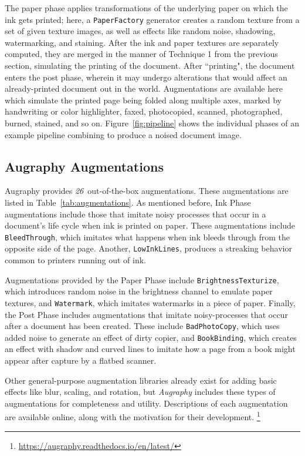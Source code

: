 \documentclass[runningheads]{llncs}
\newcommand{\numAugraphyAugmentations}{\emph{26}}
\begin{document}
The paper phase applies transformations of the underlying paper on which the ink gets printed; here, a \texttt{PaperFactory} generator creates a random texture from a set of given texture images, as well as effects like random noise, shadowing, watermarking, and staining.
After the ink and paper textures are separately computed, they are merged in the manner of Technique 1 from the previous section, simulating the printing of the document.
After ``printing", the document enters the post phase, wherein it may undergo alterations that would affect an already-printed document out in the world.
Augmentations are available here which simulate the printed page being folded along multiple axes, marked by handwriting or color highlighter, faxed, photocopied, scanned, photographed, burned, stained, and so on.
Figure~\ref{fig:pipeline} shows the individual phases of an example pipeline combining to produce a noised document image.

\subsection{Augraphy Augmentations}

Augraphy provides \numAugraphyAugmentations ~out-of-the-box augmentations.
These augmentations are listed in Table~\ref{tab:augmentations}.
As mentioned before, Ink Phase augmentations include those that imitate noisy processes that occur in a document's life cycle when ink is printed on paper.
These augmentations include \texttt{BleedThrough}, which imitates what happens when ink bleeds through from the opposite side of the page.
Another, \texttt{LowInkLines}, produces a streaking behavior common to printers running out of ink.

Augmentations provided by the Paper Phase include \texttt{BrightnessTexturize}, which introduces random noise in the brightness channel to emulate paper textures, and \texttt{Watermark}, which imitates watermarks in a piece of paper.
Finally, the Post Phase includes augmentations that imitate noisy-processes that occur after a document has been created.
These include \texttt{BadPhotoCopy}, which uses added noise to generate an effect of dirty copier, and \texttt{BookBinding}, which creates an effect with shadow and curved lines to imitate how a page from a book might appear after capture by a flatbed scanner.

Other general-purpose augmentation libraries already exist for adding basic effects like blur, scaling, and rotation, but \emph{Augraphy} includes these types of augmentations for completeness and utility.
Descriptions of each augmentation are available online, along with the motivation for their development. \footnote{\url{https://augraphy.readthedocs.io/en/latest/}}
\end{document}
